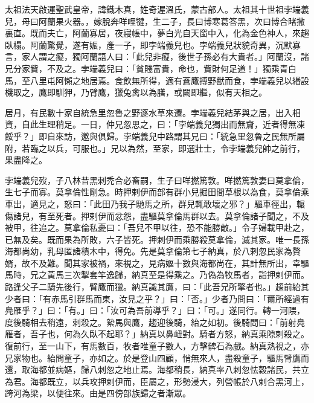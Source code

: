 
\begin{pinyinscope}

 太祖法天啟運聖武皇帝，諱鐵木真，姓奇渥溫氏，蒙古部人。太祖其十世祖孛端義兒，母曰阿蘭果火器。，嫁脫奔咩哩犍，生二子，長曰博寒葛答黑，次曰博合睹撒裏直。既而夫亡，阿蘭寡居，夜寢帳中，夢白光自天窗中入，化為金色神人，來趨臥榻。阿蘭驚覺，遂有娠，產一子，即孛端義兒也。孛端義兒狀貌奇異，沉默寡言，家人謂之癡，獨阿蘭語人曰：「此兒非癡，後世子孫必有大貴者。」阿蘭沒，諸兄分家貲，不及之。孛端義兒曰：「貧賤富貴，命也，貲財何足道！」獨乘青白馬，至八里屯阿懶之地居焉。食飲無所得，適有蒼鷹搏野獸而食，孛端義兒以緡設機取之，鷹即馴狎，乃臂鷹，獵兔禽以為膳，或闕即繼，似有天相之。



 居月，有民數十家自統急里忽魯之野逐水草來遷。孛端義兒結茅與之居，出入相資，自此生理稍足。一日，仲兄忽思之，曰：「孛端義兒獨出而無齎，近者得無凍餒乎？」即自來訪，邀與俱歸。孛端義兒中路謂其兄曰：「統急里忽魯之民無所屬附，若臨之以兵，可服也。」兄以為然，至家，即選壯士，令孛端義兒帥之前行，果盡降之。



 孛端義兒歿，子八林昔黑剌禿合必畜嗣，生子曰咩撚篤敦。咩撚篤敦妻曰莫拿倫，生七子而寡。莫拿倫性剛急。時押剌伊而部有群小兒掘田間草根以為食，莫拿倫乘車出，適見之，怒曰：「此田乃我子馳馬之所，群兒輒敢壞之邪？」驅車徑出，輾傷諸兒，有至死者。押剌伊而忿怨，盡驅莫拿倫馬群以去。莫拿倫諸子聞之，不及被甲，往追之。莫拿倫私憂曰：「吾兒不甲以往，恐不能勝敵。」令子婦載甲赴之，已無及矣。既而果為所敗，六子皆死。押剌伊而乘勝殺莫拿倫，滅其家。唯一長孫海都尚幼，乳母匿諸積木中，得免。先是莫拿倫第七子納真，於八剌忽民家為贅婿，故不及難。聞其家被禍，來視之，見病嫗十數與海都尚在，其計無所出，幸驅馬時，兄之黃馬三次掣套竿逸歸，納真至是得乘之。乃偽為牧馬者，詣押剌伊而。路逢父子二騎先後行，臂鷹而獵。納真識其鷹，曰：「此吾兄所擎者也。」趨前紿其少者曰：「有赤馬引群馬而東，汝見之乎？」曰：「否。」少者乃問曰：「爾所經過有鳧雁乎？」曰：「有。」曰：「汝可為吾前導乎？」曰：「可。」遂同行。轉一河隈，度後騎相去稍遠，刺殺之。縶馬與鷹，趨迎後騎，紿之如初。後騎問曰：「前射鳧雁者，吾子也，何為久臥不起耶？」納真以鼻衄對。騎者方怒，納真乘隙刺殺之。復前行，至一山下，有馬數百，牧者唯童子數人，方擊髀石為戲。納真熟視之，亦兄家物也。紿問童子，亦如之。於是登山四顧，悄無來人，盡殺童子，驅馬臂鷹而還，取海都並病嫗，歸八剌忽之地止焉。海都稍長，納真率八剌忽怯穀諸民，共立為君。海都既立，以兵攻押剌伊而，臣屬之，形勢浸大，列營帳於八剌合黑河上，跨河為梁，以便往來。由是四傍部族歸之者漸眾。




\end{pinyinscope}
